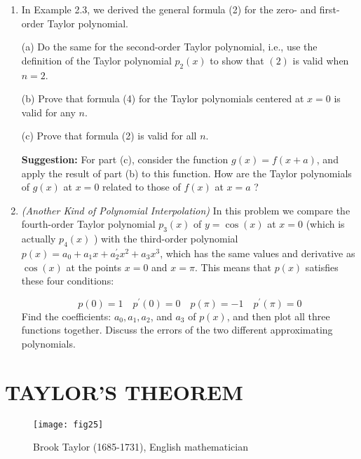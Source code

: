 \documentclass[../main.tex]{subfiles}
\begin{document}
\begin{enumerate}
\item In Example 2.3, we derived the general formula (2) for the zero- and first-order Taylor polynomial.

(a) Do the same for the second-order Taylor polynomial, i.e., use the definition of the Taylor polynomial $p_{2}(x)$ to show that $(2)$ is valid when $n=2$.

(b) Prove that formula (4) for the Taylor polynomials centered at $x=0$ is valid for any $n$.

(c) Prove that formula (2) is valid for all $n$.

\textbf{Suggestion:} For part (c), consider the function $g(x)=f(x+a)$, and apply the result of part (b) to this function. How are the Taylor polynomials of $g(x)$ at $x=0$ related to those of $f(x)$ at $x=a$ ?

\item \emph{(Another Kind of Polynomial Interpolation)} In this problem we compare the fourth-order Taylor polynomial $p_{3}(x)$ of $y=\cos (x)$ at $x=0$ (which is actually $p_{4}(x)$ ) with the third-order polynomial $p(x)=a_{0}+a_{1} x+a_{2}^{\prime} x^{2}+a_{3} x^{3}$, which has the same values and derivative as $\cos (x)$ at the points $x=0$ and $x=\pi$. This means that $p(x)$ satisfies these four conditions:

$$
p(0)=1 \quad p^{\prime}(0)=0 \quad p(\pi)=-1 \quad p^{\prime}(\pi)=0
$$
Find the coefficients: $a_{0}, a_{1}, a_{2}$, and $a_{3}$ of $p(x)$, and then plot all three functions together. Discuss the errors of the two different approximating polynomials.
\end{enumerate}

\section{TAYLOR'S THEOREM}

\begin{wrapfigure}{l}{0.25\textwidth}
\texttt{[image: fig25]} 
\caption{Brook Taylor (1685-1731), English mathematician \protect\footnotemark[2]}
\label{fig:fig_2_5}
\end{wrapfigure}
\end{document}
